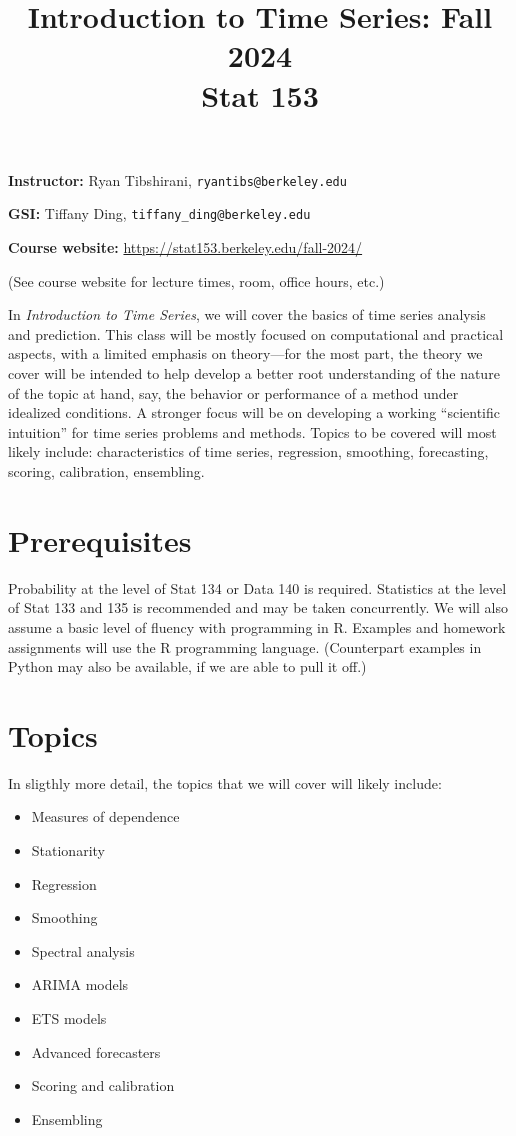 \documentclass[11pt]{article}
\title{Introduction to Time Series: Fall 2024 \\ \smallskip
\large \Large Stat 153}
\author{}
\date{}
\begin{document}
\maketitle
\RaggedRight
\vspace{-50pt}

{\bf Instructor:}
Ryan Tibshirani, {\tt ryantibs@berkeley.edu} 

{\bf GSI:} 
Tiffany Ding, {\tt tiffany\_ding@berkeley.edu} 

{\bf Course website:}
\url{https://stat153.berkeley.edu/fall-2024/}

(See course website for lecture times, room, office hours, etc.)

\bigskip
In \emph{Introduction to Time Series}, we will cover the basics of time series 
analysis and prediction. This class will be mostly focused on computational and
practical aspects, with a limited emphasis on theory---for the most part, the 
theory we cover will be intended to help develop a better root understanding of
the nature of the topic at hand, say, the behavior or performance of a method
under idealized conditions. A stronger focus will be on developing a working 
``scientific intuition'' for time series problems and methods. Topics to be
covered will most likely include: characteristics of time series, regression, 
smoothing, forecasting, scoring, calibration, ensembling. 

\section*{Prerequisites}

Probability at the level of Stat 134 or Data 140 is required. Statistics at the
level of Stat 133 and 135 is recommended and may be taken concurrently. We will 
also assume a basic level of fluency with programming in R. Examples and
homework assignments will use the R programming language. (Counterpart examples
in Python may also be available, if we are able to pull it off.)

\section*{Topics}

In sligthly more detail, the topics that we will cover will likely include: 

\begin{itemize}
\item Measures of dependence
\item Stationarity
\item Regression
\item Smoothing
\item Spectral analysis
\item ARIMA models
\item ETS models
\item Advanced forecasters
\item Scoring and calibration
\item Ensembling
\end{itemize}
\end{document}
